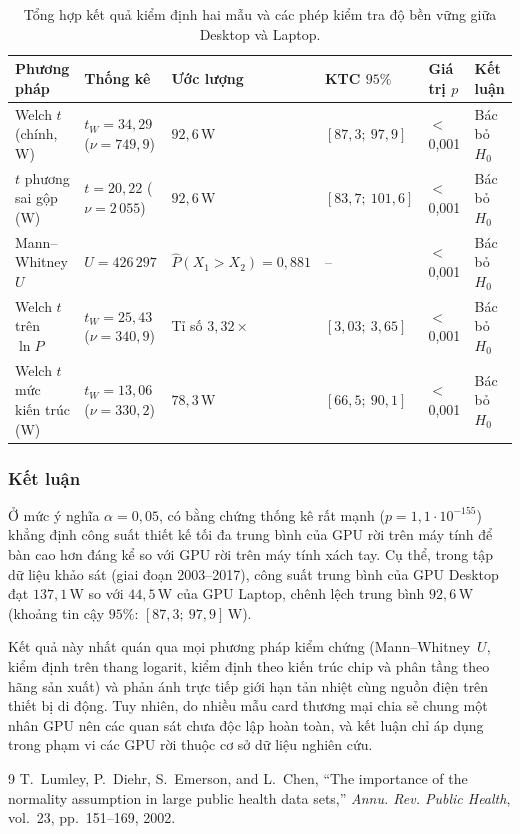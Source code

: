 \documentclass[12pt, a4paper]{article}
\begin{document}
\begin{table}[H]
  \centering
  \caption{Tổng hợp kết quả kiểm định hai mẫu và các phép kiểm tra độ bền vững giữa Desktop và Laptop.}
  \label{tab:two_sample_tests}
  \begin{tabular}{llllll}
    \toprule
    Phương pháp & Thống kê & Ước lượng & KTC $95\%$ & Giá trị $p$ & Kết luận \\
    \midrule
    Welch $t$ (chính, W)          & $t_W = 34{,}29$ ($\nu = 749{,}9$)   & $92{,}6$\,W                        & $[87{,}3;\ 97{,}9]$   & $<$ 0,001 & Bác bỏ $H_0$ \\
    $t$ phương sai gộp (W)        & $t = 20{,}22$ ($\nu = 2\,055$)     & $92{,}6$\,W                        & $[83{,}7;\ 101{,}6]$  & $<$ 0,001 & Bác bỏ $H_0$ \\
    Mann--Whitney $U$             & $U = 426\,297$                     & $\hat{P}(X_1 > X_2) = 0{,}881$     & --                    & $<$ 0,001 & Bác bỏ $H_0$ \\
    Welch $t$ trên $\ln P$        & $t_W = 25{,}43$ ($\nu = 340{,}9$)   & Tỉ số $3{,}32\times$               & $[3{,}03;\ 3{,}65]$   & $<$ 0,001 & Bác bỏ $H_0$ \\
    Welch $t$ mức kiến trúc (W)   & $t_W = 13{,}06$ ($\nu = 330{,}2$)   & $78{,}3$\,W                        & $[66{,}5;\ 90{,}1]$   & $<$ 0,001 & Bác bỏ $H_0$ \\
    \bottomrule
  \end{tabular}
\end{table}

\subsubsection{Kết luận}
Ở mức ý nghĩa $\alpha = 0{,}05$, có bằng chứng thống kê rất mạnh ($p = 1{,}1 \cdot 10^{-155}$) khẳng định công suất thiết kế tối đa trung bình của GPU rời trên máy tính để bàn cao hơn đáng kể so với GPU rời trên máy tính xách tay. Cụ thể, trong tập dữ liệu khảo sát (giai đoạn 2003--2017), công suất trung bình của GPU Desktop đạt $137{,}1$\,W so với $44{,}5$\,W của GPU Laptop, chênh lệch trung bình $92{,}6$\,W (khoảng tin cậy $95\%$: $[87{,}3;\ 97{,}9]$\,W).

Kết quả này nhất quán qua mọi phương pháp kiểm chứng (Mann--Whitney~$U$, kiểm định trên thang logarit, kiểm định theo kiến trúc chip và phân tầng theo hãng sản xuất) và phản ánh trực tiếp giới hạn tản nhiệt cùng nguồn điện trên thiết bị di động. Tuy nhiên, do nhiều mẫu card thương mại chia sẻ chung một nhân GPU nên các quan sát chưa độc lập hoàn toàn, và kết luận chỉ áp dụng trong phạm vi các GPU rời thuộc cơ sở dữ liệu nghiên cứu.

\begin{thebibliography}{9}
T.~Lumley, P.~Diehr, S.~Emerson, and L.~Chen, ``The importance of the normality assumption in large public health data sets,'' \textit{Annu. Rev. Public Health}, vol.~23, pp.~151--169, 2002.
\end{thebibliography}
\end{document}
